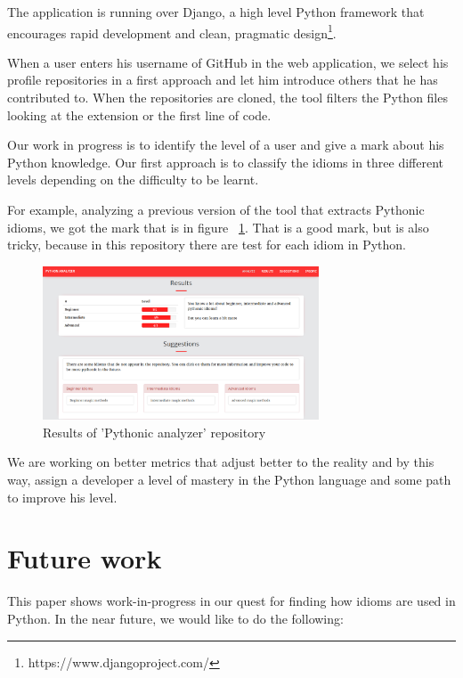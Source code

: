 \documentclass[a4paper]{article}
\begin{document}
The application is running over Django, a high level Python framework that encourages rapid development and clean, pragmatic design\footnote{https://www.djangoproject.com/}.

When a user enters his username of GitHub in the web application, we select his profile repositories in a first approach and let him introduce others that he has contributed to. When the repositories are cloned, the tool filters the Python files looking at the extension or the first line of code.

Our work in progress is to identify the level of a user and give a mark about his Python knowledge. Our first approach is to classify the idioms in three different levels depending on the difficulty to be learnt.

For example, analyzing a previous version of the tool that extracts Pythonic idioms, we got the mark that is in figure ~\ref{fig:mark_pythonic}. That is a good mark, but is also tricky, because in this repository there are test for each idiom in Python.

\begin{figure}[ht]
\centering  
\includegraphics[width=82mm]{img/results_pythonic.png}
\caption{Results of 'Pythonic analyzer' repository}
\label{fig:mark_pythonic}
\end{figure}

We are working on better metrics that adjust better to the reality and by this way, assign a developer a level of mastery in the Python language and some path to improve his level.


\section{Future work}

This paper shows work-in-progress in our quest for finding how idioms are used in Python. In the near future, we would like to do the following:
\end{document}
